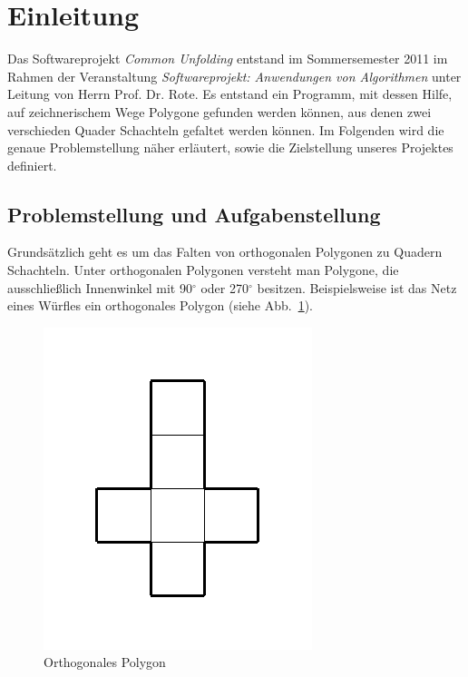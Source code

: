 \section{Einleitung}
\label{sec:einleitung}

Das Softwareprojekt \emph{Common Unfolding} entstand im Sommersemester 2011 im Rahmen der Veranstaltung \emph{Softwareprojekt: Anwendungen von Algorithmen} unter Leitung von Herrn Prof. Dr. Rote. Es entstand ein Programm, mit dessen Hilfe, auf zeichnerischem Wege Polygone gefunden werden können, aus denen zwei verschieden Quader \bzw Schachteln gefaltet werden können. Im Folgenden wird die genaue Problemstellung näher erläutert, sowie die Zielstellung unseres Projektes definiert.


\subsection{Problemstellung und Aufgabenstellung}
\label{subsec:problemstellung}

Grundsätzlich geht es um das Falten von orthogonalen Polygonen zu Quadern \bzw Schachteln. Unter orthogonalen Polygonen versteht man Polygone, die ausschließlich Innenwinkel mit 90$^\circ$ oder 270$^\circ$ besitzen. Beispielsweise ist das Netz eines Würfles ein orthogonales Polygon (siehe Abb.~\ref{fig:polygon}).

\begin{figure}[htbp]
\centering
\includegraphics{03_pics/polygon.pdf}
\caption{Orthogonales Polygon}
\label{fig:polygon}
\end{figure}

